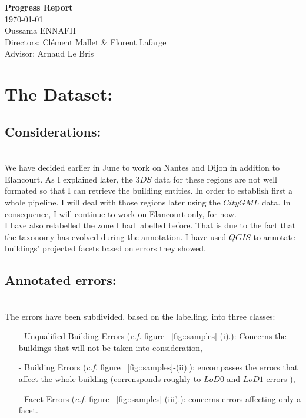 \documentclass[a4paper, 11pt]{article}
\begin{document}
	\begin{centering}
		\Large{\textbf{Progress Report}}\\
		\large{\today}
~\\
		Oussama ENNAFII\\
		Directors: Cl\'ement Mallet \& Florent Lafarge \\
		Advisor: Arnaud Le Bris \\

	\end{centering}


	\section{The Dataset:}
	\subsection{Considerations:}
~\\

	We have decided earlier in June to work on Nantes and Dijon in addition to
	Elancourt. As I explained later, the $3DS$ data for these regions are not
	well formated so that I can retrieve the building entities. In order to
	establish first a whole pipeline. I will deal with those regions later using
	the $CityGML$ data. In consequence, I will continue to work on Elancourt
	only, for now.\\

	I have also relabelled the zone I had labelled before. That is due to the fact
	that the taxonomy has evolved during the annotation. I have used $QGIS$ to
	annotate buildings' projected facets based on errors they showed.\\

	\subsection{Annotated errors:}
~\\


	The errors have been subdivided, based on the labelling, into three classes:

	\begin{itemize}
		\item[-] Unqualified Building Errors (\textit{c.f.} figure ~\ref{fig::samples}-(i).): Concerns the buildings that will not
		be taken into consideration,
		\item[-] Building Errors (\textit{c.f.} figure ~\ref{fig::samples}-(ii).):
		encompasses the errors that affect the whole
		building (corrensponds roughly to $LoD0$ and $LoD1$ errors ),
		\item[-] Facet Errors (\textit{c.f.} figure ~\ref{fig::samples}-(iii).):
		concerns errors affecting only a facet.
	\end{itemize}
\end{document}
